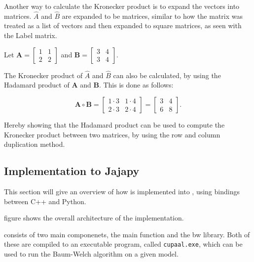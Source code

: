Another way to calculate the Kronecker product is to expand the vectors into matrices.
$\hat{A}$ and $\hat{B}$ are expanded to be matrices, similar to how the matrix was treated as a list of vectors and then expanded to square matrices, as seen with the Label matrix.

Let $\mathbf{A} = \begin{bmatrix}
            1 & 1 \\
            2 & 2
      \end{bmatrix}$ and
$\mathbf{B} = \begin{bmatrix}
            3 & 4 \\
            3 & 4
      \end{bmatrix}$.

The Kronecker product of $\hat{A}$ and $\hat{B}$ can also be calculated, by using the Hadamard product of $\mathbf{A}$ and $\mathbf{B}$.
This is done as follows:

\begin{equation}
      \mathbf{A} \circ \mathbf{B} = \begin{bmatrix}
            1 \cdot 3 & 1 \cdot 4 \\
            2 \cdot 3 & 2 \cdot 4
      \end{bmatrix} = \begin{bmatrix}
            3 & 4 \\
            6 & 8
      \end{bmatrix}.
\end{equation}

Hereby showing that the Hadamard product can be used to compute the Kronecker product between two matrices, by using the row and column duplication method.




\subsection{Implementation to Jajapy}\label{subsec:implementation-to-jajapy}
This section will give an overview of how \Cupaal is implemented into \Jajapy, using bindings between C++ and Python.

figure  shows the overall architecture of the implementation.

\Cupaal consists of two main componenets, the main function and the \gls{bw} library.
Both of these are compiled to an executable program, called \texttt{cupaal.exe}, which can be used to run the Baum-Welch algorithm on a given model.

